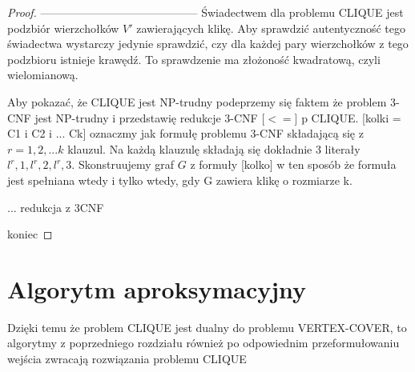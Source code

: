 \begin{proof}
------------------------------------------
Świadectwem dla problemu CLIQUE jest podzbiór wierzchołków $V'$ zawierających klikę. Aby sprawdzić autentyczność tego świadectwa wystarczy jedynie sprawdzić, czy dla każdej pary wierzchołków z tego podzbioru istnieje krawędź. To sprawdzenie ma złożoność kwadratową, czyli wielomianową.

Aby pokazać, że CLIQUE jest NP-trudny podeprzemy się faktem że problem 3-CNF jest NP-trudny i przedstawię redukcje 3-CNF [$<=$] p CLIQUE. [kolki = C1 i C2 i ... Ck] oznaczmy jak formułę problemu 3-CNF składającą się z $r = 1,2,...k$ klauzul. Na każdą klauzulę składają się dokładnie 3 literały $l^r,1, l^r,2, l^r,3$. Skonstruujemy graf $G$ z formuły [kolko] w ten sposób że formuła jest spełniana wtedy i tylko wtedy, gdy G zawiera klikę o rozmiarze k.


... redukcja z 3CNF



koniec
\end{proof}


\section{Algorytm aproksymacyjny}

Dzięki temu że problem CLIQUE jest dualny do problemu VERTEX-COVER, to algorytmy z poprzedniego rozdziału również po odpowiednim przeformułowaniu wejścia zwracają rozwiązania problemu CLIQUE